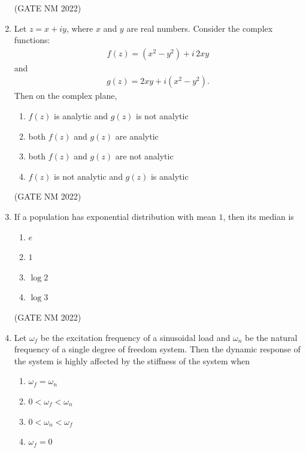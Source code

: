 \documentclass[journal,12pt,onecolumn]{IEEEtran}
\theoremstyle{remark}
\begin{document}
\begin{enumerate}
\hfill(GATE NM 2022)

\item  Let $z = x + i y$, where $x$ and $y$ are real numbers. Consider the complex functions:
\begin{align*}
f(z) = (x^2 - y^2) + i\,  2xy
\end{align*}
and
\begin{align*}
g(z) = 2xy + i (x^2 - y^2).
\end{align*}
Then on the complex plane,
\begin{enumerate}
    \item $f(z)$ is analytic and $g(z)$ is not analytic
    \item both $f(z)$ and $g(z)$ are analytic
    \item both $f(z)$ and $g(z)$ are not analytic
    \item $f(z)$ is not analytic and $g(z)$ is analytic
\end{enumerate}

\hfill(GATE NM 2022)

\item  If a population has exponential distribution with mean $1$, then its median is
	\begin{multicols}{4}
\begin{enumerate}
    \item $e$
    \item $1$
    \item $\log 2$
    \item $\log 3$
\end{enumerate}
	\end{multicols}

\hfill(GATE NM 2022)

\item  Let $\omega_f$ be the excitation frequency of a sinusoidal load and $\omega_n$ be the natural frequency of a single degree of freedom system. Then the dynamic response of the system is highly affected by the stiffness of the system when
	\begin{multicols}{2}
\begin{enumerate}
    \item $\omega_f = \omega_n$
    \item $0 < \omega_f < \omega_n$
    \item $0 < \omega_n < \omega_f$
    \item $\omega_f = 0$
\end{enumerate}
	\end{multicols}


\end{enumerate}
\end{document}
